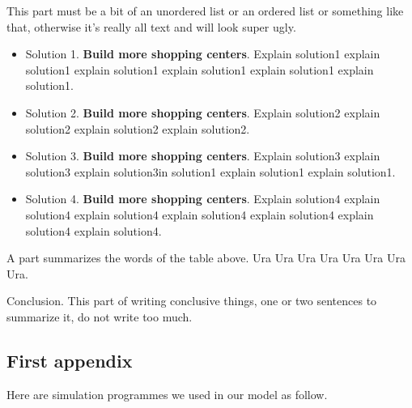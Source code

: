\documentclass{mcmthesis}
\begin{document}
	
	This part must be a bit of an unordered list or an ordered list or something like that, otherwise it's really all text and will look super ugly.
	
	
	\begin{itemize}
		\item Solution 1. \textbf{Build more shopping centers}. Explain solution1 explain solution1 explain solution1 explain solution1 explain solution1 explain solution1.
		\item Solution 2. \textbf{Build more shopping centers}. Explain solution2 explain solution2 explain solution2 explain solution2.
		\item Solution 3. \textbf{Build more shopping centers}. Explain solution3 explain solution3 explain solution3in solution1 explain solution1 explain solution1.
		\item Solution 4. \textbf{Build more shopping centers}. Explain solution4 explain solution4 explain solution4 explain solution4 explain solution4 explain solution4 explain solution4.
	\end{itemize}
	
	\vspace{-0.4cm}
	
	A part summarizes the words of the table above. Ura Ura Ura Ura Ura Ura Ura Ura. 
	
	
	Conclusion. This part of writing conclusive things, one or two sentences to summarize it, do not write too much.
	
	
	\newpage
	
	\newpage
	
	
	\begin{appendices}
		\section{First appendix}
		\lipsum[13]
		Here are simulation programmes we used in our model as follow.\\
	\end{appendices}
	\label{LastPage}
\end{document}
